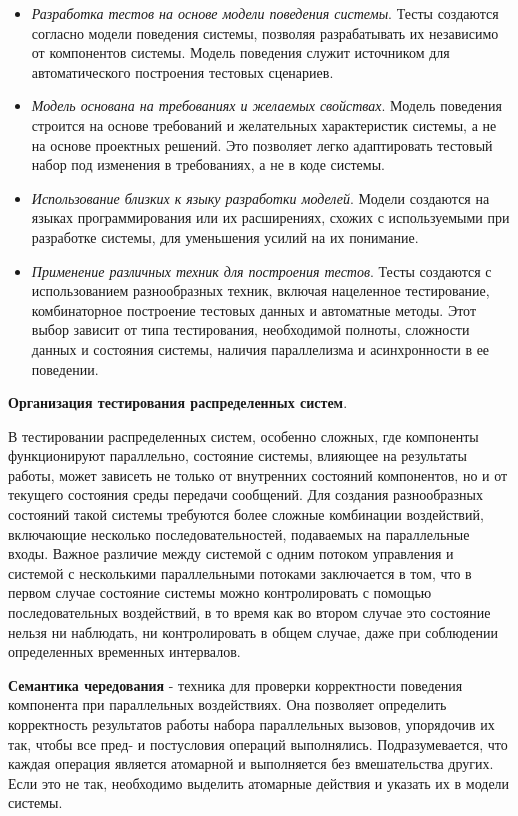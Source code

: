 \begin{itemize}
    \item \textit{Разработка тестов на основе модели поведения системы}. Тесты создаются согласно модели поведения системы, позволяя разрабатывать их независимо от компонентов системы. Модель поведения служит источником для автоматического построения тестовых сценариев.
    \item \textit{Модель основана на требованиях и желаемых свойствах}. Модель поведения строится на основе требований и желательных характеристик системы, а не на основе проектных решений. Это позволяет легко адаптировать тестовый набор под изменения в требованиях, а не в коде системы.
    \item \textit{Использование близких к языку разработки моделей}. Модели создаются на языках программирования или их расширениях, схожих с используемыми при разработке системы, для уменьшения усилий на их понимание.
    \item \textit{Применение различных техник для построения тестов}. Тесты создаются с использованием разнообразных техник, включая нацеленное тестирование, комбинаторное построение тестовых данных и автоматные методы. Этот выбор зависит от типа тестирования, необходимой полноты, сложности данных и состояния системы, наличия параллелизма и асинхронности в ее поведении.
\end{itemize}


\textbf{Организация тестирования распределенных систем}. 

В тестировании распределенных систем, особенно сложных, где компоненты функционируют параллельно, состояние системы, влияющее на результаты работы, может зависеть не только от внутренних состояний компонентов, но и от текущего состояния среды передачи сообщений. Для создания разнообразных состояний такой системы требуются более сложные комбинации воздействий, включающие несколько последовательностей, подаваемых на параллельные входы. Важное различие между системой с одним потоком управления и системой с несколькими параллельными потоками заключается в том, что в первом случае состояние системы можно контролировать с помощью последовательных воздействий, в то время как во втором случае это состояние нельзя ни наблюдать, ни контролировать в общем случае, даже при соблюдении определенных временных интервалов.


\textbf{Семантика чередования} - техника для проверки корректности поведения компонента при параллельных воздействиях. Она позволяет определить корректность результатов работы набора параллельных вызовов, упорядочив их так, чтобы все пред- и постусловия операций выполнялись. Подразумевается, что каждая операция является атомарной и выполняется без вмешательства других. Если это не так, необходимо выделить атомарные действия и указать их в модели системы.

